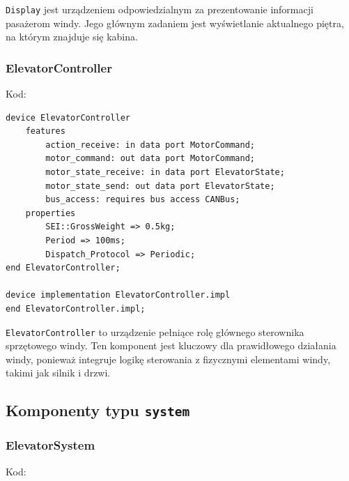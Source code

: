 \documentclass{article}
\begin{document}
    \texttt{Display} jest urządzeniem odpowiedzialnym za prezentowanie informacji pasażerom windy. Jego głównym zadaniem jest wyświetlanie aktualnego piętra, na którym znajduje się kabina. 


    \subsubsection{ElevatorController}

    Kod:
    
    \begin{lstlisting}[basicstyle=\ttfamily, keywordstyle=\bfseries]
device ElevatorController
    features
        action_receive: in data port MotorCommand;
        motor_command: out data port MotorCommand;
        motor_state_receive: in data port ElevatorState;
        motor_state_send: out data port ElevatorState;
        bus_access: requires bus access CANBus;
    properties
        SEI::GrossWeight => 0.5kg;
        Period => 100ms;
        Dispatch_Protocol => Periodic;
end ElevatorController;

device implementation ElevatorController.impl
end ElevatorController.impl;
    \end{lstlisting}

    \texttt{ElevatorController}  to urządzenie pełniące rolę głównego sterownika sprzętowego windy. Ten komponent jest kluczowy dla prawidłowego działania windy, ponieważ integruje logikę sterowania z fizycznymi elementami windy, takimi jak silnik i drzwi.




    \subsection{Komponenty typu \texttt{system}}

    
    \subsubsection{ElevatorSystem}

    Kod:
    
\end{document}
